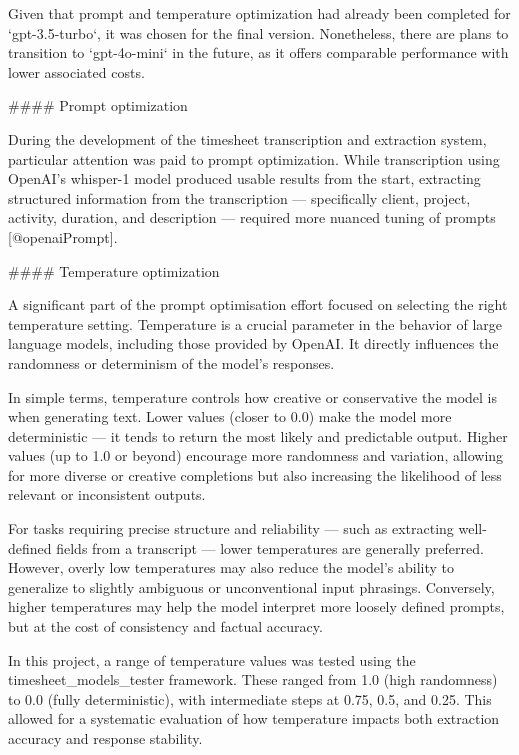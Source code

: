 \documentclass[
  digital,     %
  oneside,     %
  nosansbold,  %
  nocolorbold, %
  lof,         %
  lot,         %
]{fithesis4}
\begin{document}
\shorthandoff{-}
\begin{markdown}

Given that prompt and temperature optimization had already been completed for `gpt-3.5-turbo`, it was chosen for the final version. Nonetheless, there are plans to transition to `gpt-4o-mini` in the future, as it offers comparable performance with lower associated costs.

#### Prompt optimization

During the development of the timesheet transcription and extraction system, particular attention was paid to prompt optimization. While transcription using OpenAI's whisper-1 model produced usable results from the start, extracting structured information from the transcription — specifically client, project, activity, duration, and description — required more nuanced tuning of prompts [@openaiPrompt].

#### Temperature optimization

A significant part of the prompt optimisation effort focused on selecting the right temperature setting. Temperature is a crucial parameter in the behavior of large language models, including those provided by OpenAI. It directly influences the randomness or determinism of the model's responses.

In simple terms, temperature controls how creative or conservative the model is when generating text. Lower values (closer to 0.0) make the model more deterministic — it tends to return the most likely and predictable output. Higher values (up to 1.0 or beyond) encourage more randomness and variation, allowing for more diverse or creative completions but also increasing the likelihood of less relevant or inconsistent outputs.

For tasks requiring precise structure and reliability — such as extracting well-defined fields from a transcript — lower temperatures are generally preferred. However, overly low temperatures may also reduce the model's ability to generalize to slightly ambiguous or unconventional input phrasings. Conversely, higher temperatures may help the model interpret more loosely defined prompts, but at the cost of consistency and factual accuracy.

In this project, a range of temperature values was tested using the timesheet_models_tester framework. These ranged from 1.0 (high randomness) to 0.0 (fully deterministic), with intermediate steps at 0.75, 0.5, and 0.25. This allowed for a systematic evaluation of how temperature impacts both extraction accuracy and response stability.

\end{markdown}
\shorthandon{-}
\end{document}
